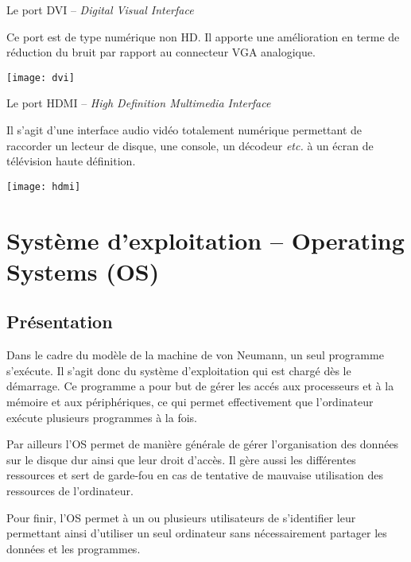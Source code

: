 \begin{minipage}[c]{.85\linewidth}
Le port DVI -- \textit{Digital Visual Interface}

Ce port est de type numérique non HD. Il apporte une amélioration en terme de réduction du bruit par rapport au connecteur VGA analogique.
\end{minipage} \hfill
\begin{minipage}[c]{.14\linewidth}
\begin{center}
\texttt{[image: dvi]}
\end{center}
\end{minipage}


\begin{minipage}[c]{.85\linewidth}
Le port HDMI -- \textit{High Definition Multimedia Interface}

Il s'agit d'une interface audio vidéo totalement numérique permettant de raccorder un lecteur de disque, une console, un décodeur \textit{etc.} à un écran de télévision haute définition.
\end{minipage} \hfill
\begin{minipage}[c]{.14\linewidth}
\begin{center}
\texttt{[image: hdmi]}
\end{center}
\end{minipage}


\section{Système d'exploitation -- Operating Systems (OS)}
\subsection{Présentation}

Dans le cadre du modèle de la machine de von Neumann, un seul programme s’exécute. Il s'agit donc du système d'exploitation qui est chargé dès le démarrage.  Ce programme a pour but de gérer les accés aux processeurs et à la mémoire et aux périphériques, ce qui permet
effectivement que l’ordinateur exécute plusieurs programmes à la fois.

Par ailleurs l'OS permet de manière générale de gérer l'organisation des données sur le disque dur ainsi que leur droit d'accès. Il gère aussi les différentes ressources et sert de garde-fou en cas de tentative de mauvaise utilisation des ressources de l'ordinateur.

Pour finir, l'OS permet à un ou plusieurs utilisateurs de s'identifier leur permettant ainsi d'utiliser un seul ordinateur sans nécessairement partager les données et les programmes. 



